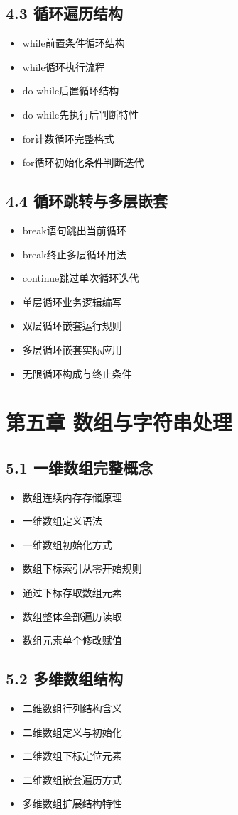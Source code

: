 \subsection{4.3 循环遍历结构}
\begin{itemize}
\item while前置条件循环结构
\item while循环执行流程
\item do-while后置循环结构
\item do-while先执行后判断特性
\item for计数循环完整格式
\item for循环初始化条件判断迭代
\end{itemize}

\subsection{4.4 循环跳转与多层嵌套}
\begin{itemize}
\item break语句跳出当前循环
\item break终止多层循环用法
\item continue跳过单次循环迭代
\item 单层循环业务逻辑编写
\item 双层循环嵌套运行规则
\item 多层循环嵌套实际应用
\item 无限循环构成与终止条件
\end{itemize}

\section{第五章 数组与字符串处理}
\subsection{5.1 一维数组完整概念}
\begin{itemize}
\item 数组连续内存存储原理
\item 一维数组定义语法
\item 一维数组初始化方式
\item 数组下标索引从零开始规则
\item 通过下标存取数组元素
\item 数组整体全部遍历读取
\item 数组元素单个修改赋值
\end{itemize}

\subsection{5.2 多维数组结构}
\begin{itemize}
\item 二维数组行列结构含义
\item 二维数组定义与初始化
\item 二维数组下标定位元素
\item 二维数组嵌套遍历方式
\item 多维数组扩展结构特性
\end{itemize}

